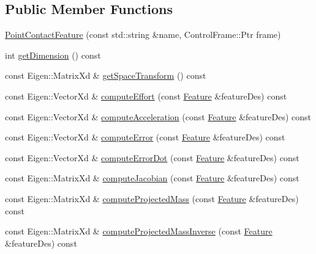 \subsection*{Public Member Functions}
\begin{DoxyCompactItemize}
\item 
\hyperlink{classocra_1_1PointContactFeature_aeaaae6acc15b47e89210b57dd34b3f73}{Point\+Contact\+Feature} (const std\+::string \&name, Control\+Frame\+::\+Ptr frame)
\item 
int \hyperlink{classocra_1_1PointContactFeature_aa2621ee588c9b593a68ace1a167d4418}{get\+Dimension} () const
\item 
const Eigen\+::\+Matrix\+Xd \& \hyperlink{classocra_1_1PointContactFeature_afb64d5566b4e57c7121e88799c15bac6}{get\+Space\+Transform} () const
\item 
const Eigen\+::\+Vector\+Xd \& \hyperlink{classocra_1_1PointContactFeature_a081fc445440857623f3df1b272a80871}{compute\+Effort} (const \hyperlink{classocra_1_1Feature}{Feature} \&feature\+Des) const
\item 
const Eigen\+::\+Vector\+Xd \& \hyperlink{classocra_1_1PointContactFeature_ab8f6f7f395e2dc59d74c0676206b12bb}{compute\+Acceleration} (const \hyperlink{classocra_1_1Feature}{Feature} \&feature\+Des) const
\item 
const Eigen\+::\+Vector\+Xd \& \hyperlink{classocra_1_1PointContactFeature_a6d9c92bc50784f7ecd8dda683d32b7aa}{compute\+Error} (const \hyperlink{classocra_1_1Feature}{Feature} \&feature\+Des) const
\item 
const Eigen\+::\+Vector\+Xd \& \hyperlink{classocra_1_1PointContactFeature_a73527a8f55f6a693d975b7a4bf3bf422}{compute\+Error\+Dot} (const \hyperlink{classocra_1_1Feature}{Feature} \&feature\+Des) const
\item 
const Eigen\+::\+Matrix\+Xd \& \hyperlink{classocra_1_1PointContactFeature_a68a3025a23aa9ff8bec2aeb0c966c352}{compute\+Jacobian} (const \hyperlink{classocra_1_1Feature}{Feature} \&feature\+Des) const
\item 
const Eigen\+::\+Matrix\+Xd \& \hyperlink{classocra_1_1PointContactFeature_a3798f3cd3649bf2360876610f7a4cf7a}{compute\+Projected\+Mass} (const \hyperlink{classocra_1_1Feature}{Feature} \&feature\+Des) const
\item 
const Eigen\+::\+Matrix\+Xd \& \hyperlink{classocra_1_1PointContactFeature_a5425d1c3dfd4148e7adf6213e80291ba}{compute\+Projected\+Mass\+Inverse} (const \hyperlink{classocra_1_1Feature}{Feature} \&feature\+Des) const
\item 

\end{DoxyCompactItemize}
